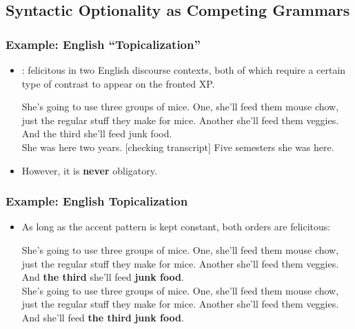 \documentclass[hyperref={pdfpagelabels=false}]{beamer}
\begin{document}
\subsection{Syntactic Optionality as Competing Grammars}
\begin{frame}
\frametitle{Example: English ``Topicalization''}
\begin{itemize}
	\item \citet{prince1985,prince1998, prince1999}: felicitous in two English discourse contexts, both of which require a certain type of contrast to appear on the fronted XP.
	
	\begin{exe}
\ex \label{princetop1} She's going to use three groups of mice.
One, she'll feed them mouse chow, just the regular stuff they make for
mice.
Another she'll feed them veggies.
And the third she'll feed junk food.\\

\ex \label{princetop2} She was here two years.
[checking transcript] Five semesters she was here.\\
\citep[][8,9]{prince1999} 

\end{exe}

	\item However, it is \textbf{never} obligatory.
\end{itemize}
\end{frame}
%
\begin{frame}
\frametitle{Example: English Topicalization}
\begin{itemize}
	\item As long as the accent pattern is kept constant, both orders are felicitous:
	
	\begin{exe}
\ex  She's going to use three groups of mice.
One, she'll feed them mouse chow, just the regular stuff they make for
mice.
Another she'll feed them veggies.
And \textbf{the third} she'll feed \textbf{junk food}.\\

\ex \label{untop1} She's going to use three groups of mice.
One, she'll feed them mouse chow, just the regular stuff they make for
mice.
Another she'll feed them veggies.
And she'll feed \textbf{the third} \textbf{junk food}.\\

\end{exe}

\end{itemize}
\end{frame}
\end{document}
